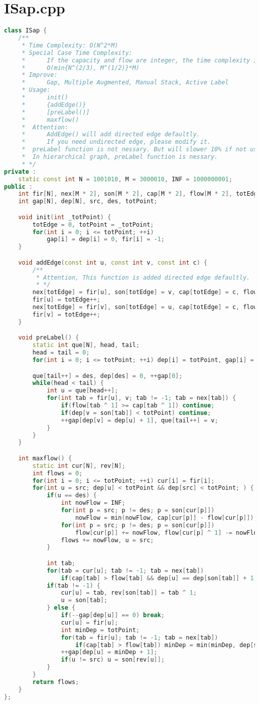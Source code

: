 \section{ISap.cpp}
\begin{lstlisting}[language=c++]
class ISap {
	/**
	 * Time Complexity: O(N^2*M)
	 * Special Case Time Complexity:
	 *		If the capacity and flow are integer, the time complexity is
	 *		O(min{N^(2/3), M^(1/2)}*M)
	 * Improve:
	 *		Gap, Multiple Augmented, Manual Stack, Active Label
	 * Usage:
	 *		init()
	 *		{addEdge()}
	 *		[preLabel()]
	 *		maxflow()
     *	Attention:
     *	    AddEdge() will add directed edge defaultly.
     *	    If you need undirected edge, please modify it.
	 *	preLabel function is not nessary. But will slower 10% if not use.
     *	In hierarchical graph, preLabel function is nessary.
	 * */
private :
	static const int N = 1001010, M = 3000010, INF = 1000000001;
public :
	int fir[N], nex[M * 2], son[M * 2], cap[M * 2], flow[M * 2], totEdge;
	int gap[N], dep[N], src, des, totPoint;

	void init(int _totPoint) {
		totEdge = 0, totPoint = _totPoint;
		for(int i = 0; i <= totPoint; ++i)
			gap[i] = dep[i] = 0, fir[i] = -1;
	}

	void addEdge(const int u, const int v, const int c) {
        /**
         * Attention, This function is added directed edge defaultly.
         * */
		nex[totEdge] = fir[u], son[totEdge] = v, cap[totEdge] = c, flow[totEdge] = 0;
		fir[u] = totEdge++;
		nex[totEdge] = fir[v], son[totEdge] = u, cap[totEdge] = c, flow[totEdge] = 0;
		fir[v] = totEdge++;
	}

	void preLabel() {
		static int que[N], head, tail;
		head = tail = 0;
		for(int i = 0; i <= totPoint; ++i) dep[i] = totPoint, gap[i] = 0;

		que[tail++] = des, dep[des] = 0, ++gap[0];
		while(head < tail) {
			int u = que[head++];
			for(int tab = fir[u], v; tab != -1; tab = nex[tab]) {
				if(flow[tab ^ 1] >= cap[tab ^ 1]) continue;
				if(dep[v = son[tab]] < totPoint) continue;
				++gap[dep[v] = dep[u] + 1], que[tail++] = v;
			}
		}
	}

	int maxflow() {
		static int cur[N], rev[N];
		int flows = 0;
		for(int i = 0; i <= totPoint; ++i) cur[i] = fir[i];
		for(int u = src; dep[u] < totPoint && dep[src] < totPoint; ) {
			if(u == des) {
				int nowFlow = INF;
				for(int p = src; p != des; p = son[cur[p]])
					nowFlow = min(nowFlow, cap[cur[p]] - flow[cur[p]]);
				for(int p = src; p != des; p = son[cur[p]])
					flow[cur[p]] += nowFlow, flow[cur[p] ^ 1] -= nowFlow;
				flows += nowFlow, u = src;
			}

			int tab;
			for(tab = cur[u]; tab != -1; tab = nex[tab])
				if(cap[tab] > flow[tab] && dep[u] == dep[son[tab]] + 1) break;
			if(tab != -1) {
				cur[u] = tab, rev[son[tab]] = tab ^ 1;
				u = son[tab];
			} else {
				if(--gap[dep[u]] == 0) break;
				cur[u] = fir[u];
				int minDep = totPoint;
				for(tab = fir[u]; tab != -1; tab = nex[tab])
					if(cap[tab] > flow[tab]) minDep = min(minDep, dep[son[tab]]);
				++gap[dep[u] = minDep + 1];
				if(u != src) u = son[rev[u]];
			}
		}
		return flows;
	}
};


\end{lstlisting}
